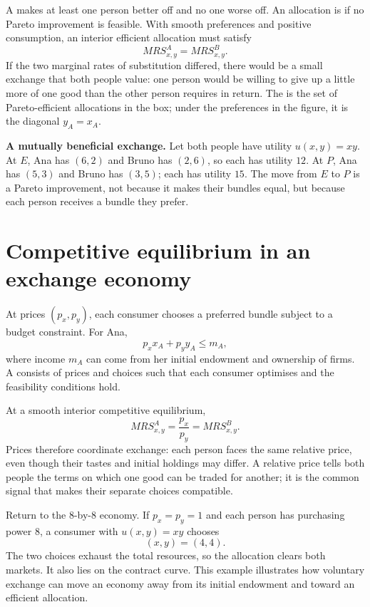 A  makes at least one person better off and no
one worse off. An allocation is  if no Pareto
improvement is feasible. With smooth preferences and positive consumption,
an interior efficient allocation must satisfy
\[
MRS^A_{x,y}=MRS^B_{x,y}.
\]
If the two marginal rates of substitution differed, there would be a small
exchange that both people value: one person would be willing to give up a
little more of one good than the other person requires in return. The
 is the set of Pareto-efficient allocations in the
box; under the preferences in the figure, it is the diagonal $y_A=x_A$.

\begin{exercisebox}
\textbf{A mutually beneficial exchange.}
Let both people have utility $u(x,y)=xy$. At $E$, Ana has $(6,2)$ and Bruno
has $(2,6)$, so each has utility $12$. At $P$, Ana has $(5,3)$ and Bruno has
$(3,5)$; each has utility $15$. The move from $E$ to $P$ is a Pareto
improvement, not because it makes their bundles equal, but because each
person receives a bundle they prefer.
\end{exercisebox}

\section{Competitive equilibrium in an exchange economy}

At prices $(p_x,p_y)$, each consumer chooses a preferred bundle subject to a
budget constraint. For Ana,
\[
p_xx_A+p_yy_A\leq m_A,
\]
where income $m_A$ can come from her initial endowment and ownership of firms.
A  consists of prices and choices such that
each consumer optimises and the feasibility conditions hold.

At a smooth interior competitive equilibrium,
\[
MRS^A_{x,y}=\frac{p_x}{p_y}=MRS^B_{x,y}.
\]
Prices therefore coordinate exchange: each person faces the same relative
price, even though their tastes and initial holdings may differ. A relative
price tells both people the terms on which one good can be traded for another;
it is the common signal that makes their separate choices compatible.

Return to the $8$-by-$8$ economy. If $p_x=p_y=1$ and each person has
purchasing power $8$, a consumer with $u(x,y)=xy$ chooses
\[
(x,y)=(4,4).
\]
The two choices exhaust the total resources, so the allocation clears both
markets. It also lies on the contract curve. This example illustrates how
voluntary exchange can move an economy away from its initial endowment and
toward an efficient allocation.

